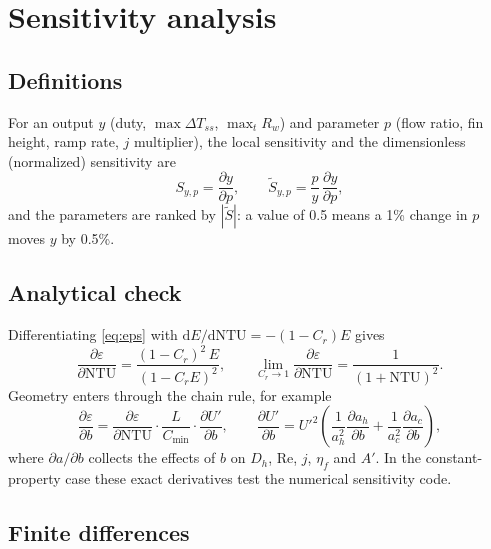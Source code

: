 \documentclass[11pt]{article}
\newcommand{\dd}{\mathrm{d}}
\newcommand{\NTU}{\mathrm{NTU}}
\newcommand{\Rey}{\mathrm{Re}}
\begin{document}
\section{Sensitivity analysis}
\label{sec:sens}

\subsection{Definitions}

For an output $y$ (duty, $\max \Delta T_{ss}$, $\max_t R_w$) and parameter $p$ (flow ratio, fin height, ramp rate, $j$ multiplier), the local sensitivity and the dimensionless (normalized) sensitivity are
\begin{equation}
  S_{y,p} = \frac{\partial y}{\partial p},
  \qquad
  \tilde S_{y,p} = \frac{p}{y}\,\frac{\partial y}{\partial p},
\end{equation}
and the parameters are ranked by $|\tilde S|$: a value of 0.5 means a 1\% change in $p$ moves $y$ by 0.5\%.

\subsection{Analytical check}

Differentiating \eqref{eq:eps} with $\dd E/\dd\NTU = -(1-C_r)E$ gives
\begin{equation}
  \frac{\partial\varepsilon}{\partial\NTU} = \frac{(1 - C_r)^2\, E}{(1 - C_r E)^2},
  \qquad
  \lim_{C_r\to 1}\frac{\partial\varepsilon}{\partial\NTU} = \frac{1}{(1 + \NTU)^2}.
\end{equation}
Geometry enters through the chain rule, for example
\begin{equation}
  \frac{\partial\varepsilon}{\partial b} = \frac{\partial\varepsilon}{\partial\NTU}\cdot\frac{L}{C_{\min}}\cdot\frac{\partial U'}{\partial b},
  \qquad
  \frac{\partial U'}{\partial b} = U'^2\left(\frac{1}{a_h^2}\frac{\partial a_h}{\partial b} + \frac{1}{a_c^2}\frac{\partial a_c}{\partial b}\right),
\end{equation}
where $\partial a/\partial b$ collects the effects of $b$ on $D_h$, $\Rey$, $j$, $\eta_f$ and $A'$. In the constant-property case these exact derivatives test the numerical sensitivity code.

\subsection{Finite differences}
\end{document}
